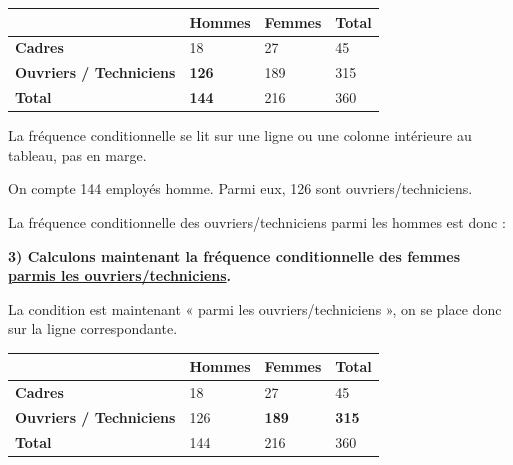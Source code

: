 \documentclass[12pt]{article}
\begin{document}
\begin{center}
    \begin{tabular}{|p{5cm}|p{3cm}|p{3cm}|p{3cm}|}
        \hline
        & \cellcolor{ForestGreen!40}\textbf{Hommes} & \rule{0pt}{0.5cm} \textbf{Femmes} & \textbf{Total} \\
        \hline
        \textbf{Cadres} & \cellcolor{ForestGreen!40}\rule{0pt}{0.5cm}18 & 27 &  45\\
        \hline
        \textbf{Ouvriers / Techniciens} & \cellcolor{ForestGreen!40}\rule{0pt}{0.5cm}\textbf{126} & 189 &  315\\
        \hline
        \textbf{Total} & \cellcolor{ForestGreen!40}\rule{0pt}{0.5cm}\textbf{144} & 216 & 360\\
        \hline
    \end{tabular}
\end{center}

\vspace{5pt}
{\color{red}La fréquence conditionnelle se lit sur une ligne ou une colonne intérieure au tableau,
pas en marge.}
\vspace{5pt}

On compte 144 employés homme. Parmi eux, 126 sont ouvriers/techniciens.
\vspace{5pt}

La fréquence conditionnelle des ouvriers/techniciens parmi les hommes est donc :
\vspace{2cm}

\vspace{15pt}

\textbf{\hspace{1cm}3) Calculons maintenant la fréquence conditionnelle des femmes\\
\underline{parmis les ouvriers/techniciens}.}

\vspace{5pt}

{\color{red}La condition est maintenant « parmi les ouvriers/techniciens », on se place donc 
sur la ligne correspondante.}

\begin{center}
    \begin{tabular}{|p{5cm}|p{3cm}|p{3cm}|p{3cm}|}
        \hline
        & \textbf{Hommes} & \rule{0pt}{0.5cm} \textbf{Femmes} & \textbf{Total} \\
        \hline
        \textbf{Cadres} & \rule{0pt}{0.5cm}18 & 27 &  45\\
        \hline
        \cellcolor{ForestGreen!40}\textbf{Ouvriers / Techniciens} & \cellcolor{ForestGreen!40}\rule{0pt}
        {0.5cm}126 & \cellcolor{ForestGreen!40}\textbf{189} &  \cellcolor{ForestGreen!40}\textbf{315}\\
        \hline
        \textbf{Total} & \rule{0pt}{0.5cm}144 & 216 & 360\\
        \hline
    \end{tabular}
\end{center}
\end{document}
